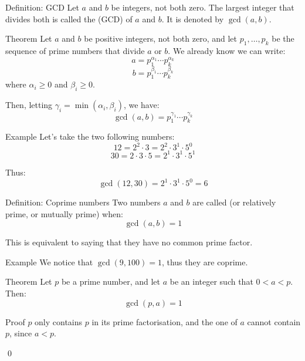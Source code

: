 \documentclass[a4paper]{article}
\begin{document}
\begin{parag}{Definition: GCD}
    Let $a$ and $b$ be integers, not both zero. The largest integer that divides both is called the  (GCD) of $a$ and $b$. It is denoted by $\gcd\left(a, b\right)$.
\end{parag}

\begin{parag}{Theorem}
    Let $a$ and $b$ be positive integers, not both zero, and let $p_1, \ldots, p_k$ be the sequence of prime numbers that divide $a$ or $b$. We already know we can write: 
    \[a = p_1^{\alpha_1} \cdots p_k^{\alpha_k}\]
    \[b = p_1^{\beta_1} \cdots p_k^{\beta_k}\]
    where $\alpha_i \geq 0$ and $\beta_i \geq 0$.

    Then, letting $\gamma_i = \min\left(\alpha_i, \beta_i\right)$, we have:
    \[\gcd\left(a, b\right) = p_1^{\gamma_1} \cdots p_k^{\gamma_k}\]
\end{parag}

\begin{parag}{Example}
    Let's take the two following numbers: 
    \[12 = 2^2 \cdot 3 = 2^2 \cdot 3^1 \cdot 5^0\]
    \[30 = 2\cdot 3\cdot 5 = 2^1 \cdot 3^1 \cdot 5^1\]

    Thus: 
    \[\gcd\left(12, 30\right) = 2^{1} \cdot 3^1 \cdot 5^0 = 6\]
\end{parag}

\begin{parag}{Definition: Coprime numbers}
    Two numbers $a$ and $b$ are called  (or relatively prime, or mutually prime) when: 
    \[\gcd\left(a, b\right) = 1\]
    
    This is equivalent to saying that they have no common prime factor.

    \begin{subparag}{Example}
        We notice that $\gcd\left(9, 100\right) = 1$, thus they are coprime.
    \end{subparag}
\end{parag}

\begin{parag}{Theorem}
    Let $p$ be a prime number, and let $a$ be an integer such that $0 < a < p$. Then: 
    \[\gcd\left(p, a\right) = 1\]
    
    \begin{subparag}{Proof}
        $p$ only contains $p$ in its prime factorisation, and the one of $a$ cannot contain $p$, since $a < p$.

        \qed
    \end{subparag}
\end{parag}
\end{document}
